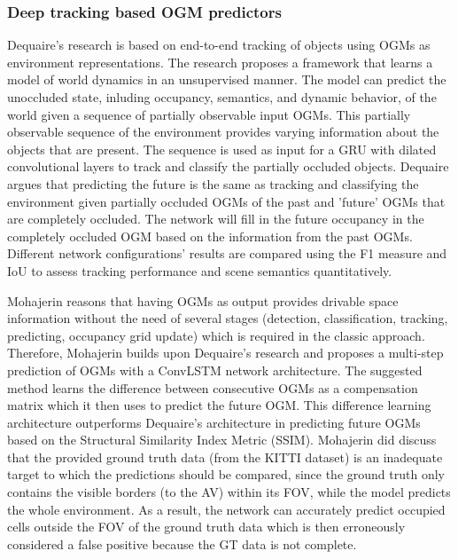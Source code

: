 \subsubsection{Deep tracking based OGM predictors}
Dequaire's \cite{dequaire2018deep} research is based on end-to-end tracking of objects using \glspl{OGM} as environment representations. The research proposes a framework that learns a model of world dynamics in an unsupervised manner. The model can predict the unoccluded state, inluding occupancy, semantics, and dynamic behavior, of the world given a sequence of partially observable input OGMs. This partially observable sequence of the environment provides varying information about the objects that are present. The sequence is used as input for a GRU with dilated convolutional layers to track and classify the partially occluded objects. Dequaire \cite{dequaire2018deep} argues that predicting the future is the same as tracking and classifying the environment given partially occluded \glspl{OGM} of the past and 'future' OGMs that are completely occluded. The network will fill in the future occupancy in the completely occluded OGM based on the information from the past OGMs. Different network configurations' results are compared using the F1 measure and IoU to assess tracking performance and scene semantics quantitatively.  

Mohajerin \cite{mohajerin2019multi} reasons that having OGMs as output provides drivable space information without the need of several stages (detection, classification, tracking, predicting, occupancy grid update) which is required in the classic approach. Therefore, Mohajerin \cite{mohajerin2019multi} builds upon Dequaire's \cite{dequaire2018deep} research and proposes a multi-step prediction of OGMs with a ConvLSTM network architecture. The suggested method learns the difference between consecutive OGMs as a compensation matrix which it then uses to predict the future OGM. This difference learning architecture outperforms Dequaire's \cite{dequaire2018deep} architecture in predicting future OGMs based on the Structural Similarity Index Metric (SSIM). Mohajerin \cite{mohajerin2019multi} did discuss that the provided ground truth data (from the KITTI \cite{geiger2013vision} dataset) is an inadequate target to which the predictions should be compared, since the ground truth only contains the visible borders (to the AV) within its FOV, while the model predicts the whole environment. As a result, the network can accurately predict occupied cells outside the FOV of the ground truth data which is then erroneously considered a false positive because the GT data is not complete.  

